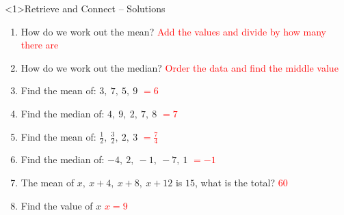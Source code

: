 \documentclass{beamer}
\begin{document}
\begin{frame}<1>{Retrieve and Connect -- Solutions}
\vspace{-0.8em}

\footnotesize
\begin{enumerate}\itemsep2pt
  \item How do we work out the mean?  
        \textcolor{red}{Add the values and divide by how many there are}
  \item How do we work out the median?  
        \textcolor{red}{Order the data and find the middle value}
  \item Find the mean of: $3,\ 7,\ 5,\ 9$  
        \textcolor{red}{$=6$}
  \item Find the median of: $4,\ 9,\ 2,\ 7,\ 8$  
        \textcolor{red}{$=7$}
  \item Find the mean of: $\frac{1}{2},\ \frac{3}{2},\ 2,\ 3$  
        \textcolor{red}{$=\frac{7}{4}$}
  \item Find the median of: $-4,\ 2,\ -1,\ -7,\ 1$  
        \textcolor{red}{$=-1$}
  \item The mean of $x,\ x+4,\ x+8,\ x+12$ is $15$, what is the total?  
        \textcolor{red}{$60$}
  \item Find the value of $x$  
        \textcolor{red}{$x=9$}
\end{enumerate}
\end{frame}
\end{document}
